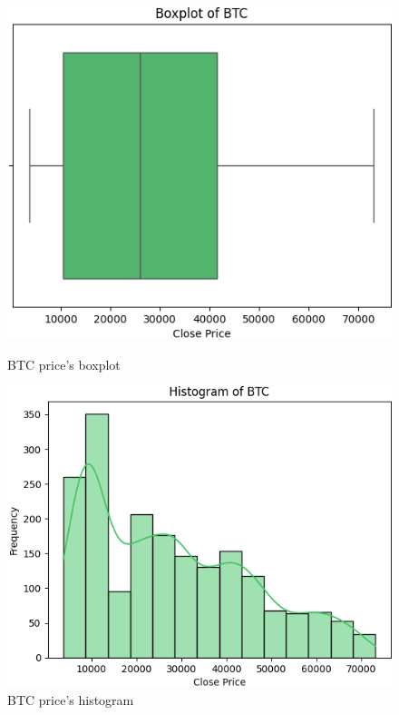 \documentclass{ieeeojies}
\begin{document}
\begin{figure}[H]
    \centering
    \begin{minipage}{0.23\textwidth}
    \centering
    \includegraphics[width=1\textwidth]{image/btc1.png}
    \caption{BTC price's boxplot}
    \label{fig:1}
    \end{minipage}
    \hfill
    \begin{minipage}{0.23\textwidth}
    \centering
    \includegraphics[width=1\textwidth]{image/btc2.png}
    \caption{BTC price's histogram}
    \label{fig:2}
    \end{minipage}
\end{figure}
\end{document}
